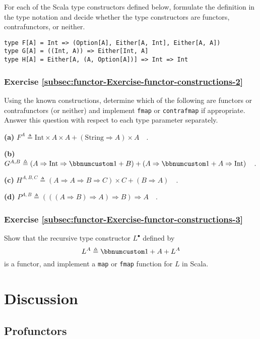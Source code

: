For each of the Scala type constructors defined below, formulate the
definition in the type notation and decide whether the type constructors
are functors, contrafunctors, or neither.
\begin{lstlisting}
type F[A] = Int => (Option[A], Either[A, Int], Either[A, A])
type G[A] = ((Int, A)) => Either[Int, A]
type H[A] = Either[A, (A, Option[A])] => Int => Int
\end{lstlisting}


\subsubsection{Exercise \label{subsec:functor-Exercise-functor-constructions-2}\ref{subsec:functor-Exercise-functor-constructions-2}}

Using the known constructions, determine which of the following are
functors or contrafunctors (or neither) and implement \lstinline!fmap!
or \lstinline!contrafmap! if appropriate. Answer this question with
respect to each type parameter separately.

\textbf{(a)} $F^{A}\triangleq\text{Int}\times A\times A+(\text{String}\Rightarrow A)\times A\quad.$

\textbf{(b)} $G^{A,B}\triangleq\left(A\Rightarrow\text{Int}\Rightarrow\bbnum 1+B\right)+\left(A\Rightarrow\bbnum 1+A\Rightarrow\text{Int}\right)\quad.$

\textbf{(c)} $H^{A,B,C}\triangleq\left(A\Rightarrow A\Rightarrow B\Rightarrow C\right)\times C+\left(B\Rightarrow A\right)\quad.$

\textbf{(d)} $P^{A,B}\triangleq\left(\left(\left(A\Rightarrow B\right)\Rightarrow A\right)\Rightarrow B\right)\Rightarrow A\quad.$

\subsubsection{Exercise \label{subsec:functor-Exercise-functor-constructions-3}\ref{subsec:functor-Exercise-functor-constructions-3}}

Show that the recursive type constructor $L^{\bullet}$ defined by
\[
L^{A}\triangleq\bbnum 1+A+L^{A}
\]
is a functor, and implement a \lstinline!map! or \lstinline!fmap!
function for $L$ in Scala.

\section{Discussion}

\subsection{Profunctors\label{subsec:f-Profunctors}}

